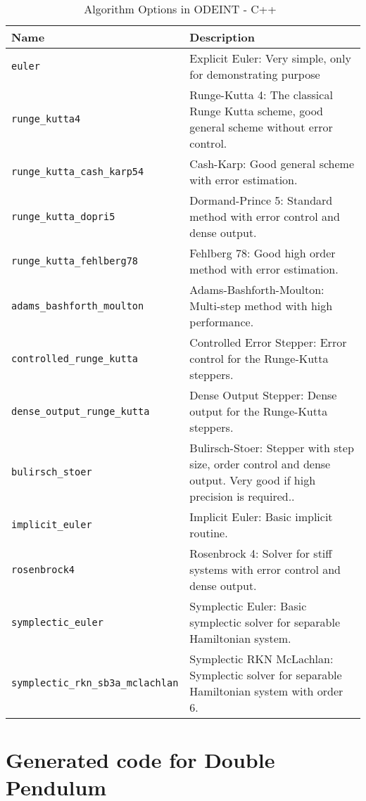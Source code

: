 \begin{table}
\begin{tabular}{ p{} p{} }
	\textbf{Name} & \textbf{Description} \\
	\toprule
	\verb|euler| & Explicit Euler: Very simple, only for demonstrating purpose\\ \hline
	\verb|runge_kutta4| & Runge-Kutta 4: The classical Runge Kutta scheme, good general scheme without error control.\\ \hline
	\verb|runge_kutta_cash_karp54| & Cash-Karp: Good general scheme with error estimation.\\ \hline
	\verb|runge_kutta_dopri5| & Dormand-Prince 5: Standard method with error control and dense output.\\ \hline
	\verb|runge_kutta_fehlberg78| & Fehlberg 78: Good high order method with error estimation.\\ \hline
	\verb|adams_bashforth_moulton| & Adams-Bashforth-Moulton: Multi-step method with high performance.\\ \hline
	\verb|controlled_runge_kutta| & Controlled Error Stepper: Error control for the Runge-Kutta steppers.\\ \hline
	\verb|dense_output_runge_kutta| & Dense Output Stepper: Dense output for the Runge-Kutta steppers.\\ \hline
	\verb|bulirsch_stoer| & Bulirsch-Stoer: Stepper with step size, order control and dense output. Very good if high precision is required..\\ \hline
	\verb|implicit_euler| & Implicit Euler: Basic implicit routine.\\ \hline
	\verb|rosenbrock4| & Rosenbrock 4: Solver for stiff systems with error control and dense output.\\ \hline
	\verb|symplectic_euler| & Symplectic Euler: Basic symplectic solver for separable Hamiltonian system.\\ \hline
	\verb|symplectic_rkn_sb3a_mclachlan| & Symplectic RKN McLachlan: Symplectic solver for separable Hamiltonian system with order 6.\\
	\bottomrule	
\end{tabular}	
\caption{Algorithm Options in ODEINT - C++~\citep{odeintfun}}	
\label{tab_algodeint}
\end{table}

\pagebreak

\section{Generated code for Double Pendulum}
\label{gencodedbl}
 

